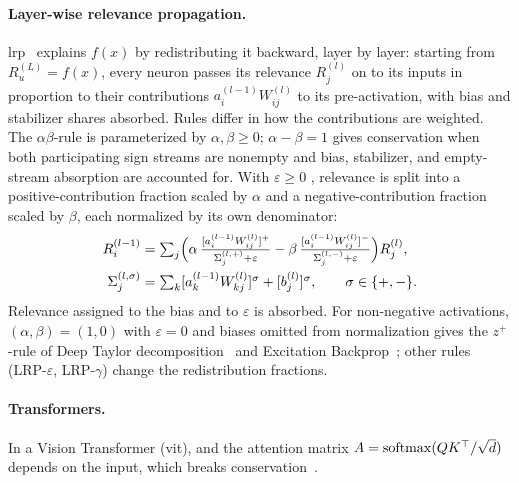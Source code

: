 \paragraph{Layer-wise relevance propagation.} \ac{lrp}~\parencite{Bach2015} explains $f(x)$ by redistributing it backward, layer by layer: starting
from $R^{(L)}_u = f(x)$, every neuron passes its relevance $R^{(l)}_j$ on to its inputs in
proportion to their contributions $a^{(l-1)}_i W^{(l)}_{ij}$ to its pre-activation, with bias and stabilizer shares absorbed.
Rules differ in how the contributions are weighted. The $\alpha\beta$-rule is parameterized by $\alpha,\beta\geq0$;
$\alpha-\beta=1$ gives conservation when both participating sign streams are nonempty and bias,
stabilizer, and empty-stream absorption are accounted for. With $\varepsilon\geq0$
,
relevance is split into a positive-contribution fraction scaled by $\alpha$ and a negative-contribution fraction scaled by
$\beta$, each normalized by its own denominator:
\begin{align}\label{ptnb:eq:lrp-ab}
    R^{(l-1)}_i &= \textstyle\sum_j \Bigl( \alpha\, \tfrac{[a^{(l-1)}_i
    W^{(l)}_{ij}]^+}{\Sigma^{(l,+)}_j + \varepsilon} - \beta\, \tfrac{[a^{(l-1)}_i
    W^{(l)}_{ij}]^-}{\Sigma^{(l,-)}_j + \varepsilon} \Bigr) R^{(l)}_j, \nonumber\\
    \Sigma^{(l,\sigma)}_j &= \textstyle\sum_k [a^{(l-1)}_k W^{(l)}_{kj}]^{\sigma} + [b^{(l)}_j]^{\sigma},\qquad \sigma\in\{+,-\}.
\end{align}
Relevance assigned to the bias and to $\varepsilon$ is absorbed. For non-negative activations,
$(\alpha,\beta)=(1,0)$ with $\varepsilon=0$ and biases omitted from normalization gives the
$z^+$-rule of Deep Taylor decomposition~\parencite{Montavon2017DeepTaylor} and
Excitation Backprop~\parencite{Zhang2018pointinggame}; other rules (LRP-$\varepsilon$, LRP-$\gamma$)
change the redistribution fractions.

\paragraph{Transformers.} In a Vision Transformer (\acs{vit}),  and the attention matrix $A = \operatorname{softmax}(QK^\top/\sqrt{d})$
depends on the input, which breaks conservation~\parencite{Ali2022AttnLRP}.

